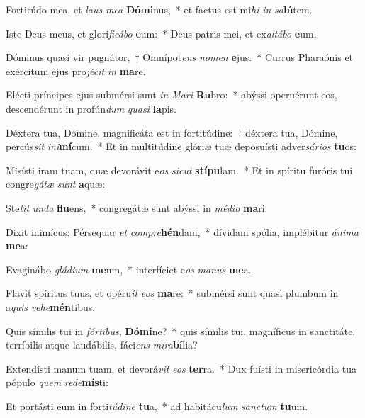 \item Fortitúdo mea, et \textit{laus} \textit{me}\textit{a} \textbf{Dó}\textbf{mi}nus,~* et factus est mi\textit{hi} \textit{in} \textit{sa}\textbf{lú}tem.
\item Iste Deus meus, et glori\textit{fi}\textit{cá}\textit{bo} \textbf{e}um:~* Deus patris mei, et ex\textit{al}\textit{tá}\textit{bo} \textbf{e}um.
\item Dóminus quasi vir pugnátor,~† Omnípot\textit{ens} \textit{no}\textit{men} \textbf{e}jus.~* Currus Pharaónis et exércitum ejus pro\textit{jé}\textit{cit} \textit{in} \textbf{ma}re.
\item Elécti príncipes ejus submérsi sunt \textit{in} \textit{Ma}\textit{ri} \textbf{Ru}bro:~* abýssi operuérunt eos, descendérunt in profún\textit{dum} \textit{qua}\textit{si} \textbf{la}pis.
\item Déxtera tua, Dómine, magnificáta est in fortitúdine:~† déxtera tua, Dómine, percús\textit{sit} \textit{in}\textit{i}\textbf{mí}cum.~* Et in multitúdine glóriæ tuæ deposuísti adver\textit{sá}\textit{ri}\textit{os} \textbf{tu}os:
\item Misísti iram tuam, quæ devorávit e\textit{os} \textit{sic}\textit{ut} \textbf{stí}\textbf{pu}lam.~* Et in spíritu furóris tui congre\textit{gá}\textit{tæ} \textit{sunt} \textbf{a}quæ:
\item Ste\textit{tit} \textit{un}\textit{da} \textbf{flu}ens,~* congregátæ sunt abýssi in \textit{mé}\textit{di}\textit{o} \textbf{ma}ri.
\item Dixit inimícus: Pérsequar \textit{et} \textit{com}\textit{pre}\textbf{hén}dam,~* dívidam spólia, implébitur \textit{á}\textit{ni}\textit{ma} \textbf{me}a:
\item Evaginábo \textit{glá}\textit{di}\textit{um} \textbf{me}um,~* interfíciet e\textit{os} \textit{ma}\textit{nus} \textbf{me}a.
\item Flavit spíritus tuus, et opéru\textit{it} \textit{e}\textit{os} \textbf{ma}re:~* submérsi sunt quasi plumbum in a\textit{quis} \textit{ve}\textit{he}\textbf{mén}tibus.
\item Quis símilis tui in \textit{fór}\textit{ti}\textit{bus}, \textbf{Dó}\textbf{mi}ne?~* quis símilis tui, magníficus in sanctitáte, terríbilis atque laudábilis, fáci\textit{ens} \textit{mi}\textit{ra}\textbf{bí}lia?
\item Extendísti manum tuam, et devorá\textit{vit} \textit{e}\textit{os} \textbf{ter}ra.~* Dux fuísti in misericórdia tua pópulo \textit{quem} \textit{red}\textit{e}\textbf{mís}ti:
\item Et portásti eum in forti\textit{tú}\textit{di}\textit{ne} \textbf{tu}a,~* ad habitácu\textit{lum} \textit{sanc}\textit{tum} \textbf{tu}um.
